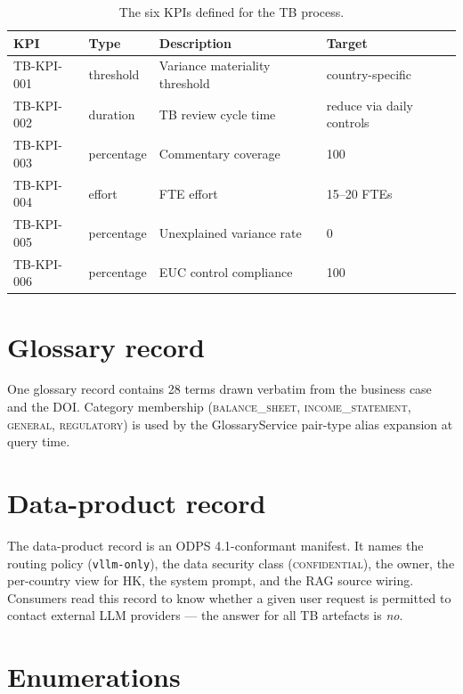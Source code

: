\begin{table}[htbp]
\caption{The six KPIs defined for the TB process.}\label{tab:kpis}
\centering
\small
\begin{tabularx}{\linewidth}{@{}llXl@{}}
\toprule
\textbf{KPI} & \textbf{Type} & \textbf{Description} & \textbf{Target} \\ \midrule
TB-KPI-001 & threshold  & Variance materiality threshold       & country-specific \\
TB-KPI-002 & duration   & TB review cycle time                 & reduce via daily controls \\
TB-KPI-003 & percentage & Commentary coverage                  & 100 \\
TB-KPI-004 & effort     & FTE effort                           & 15--20 FTEs \\
TB-KPI-005 & percentage & Unexplained variance rate            & 0 \\
TB-KPI-006 & percentage & EUC control compliance               & 100 \\
\bottomrule
\end{tabularx}
\end{table}

\section{Glossary record}

One glossary record contains 28 terms drawn verbatim from the
business case and the DOI. Category membership
(\textsc{balance\_sheet}, \textsc{income\_statement}, \textsc{general},
\textsc{regulatory}) is used by the GlossaryService pair-type alias
expansion at query time.

\section{Data-product record}

The data-product record is an ODPS 4.1-conformant manifest. It names
the routing policy (\texttt{vllm-only}), the data security class
(\textsc{confidential}), the owner, the per-country view for HK, the
system prompt, and the RAG source wiring. Consumers read this record
to know whether a given user request is permitted to contact external
LLM providers --- the answer for all TB artefacts is \emph{no}.

\section{Enumerations}

